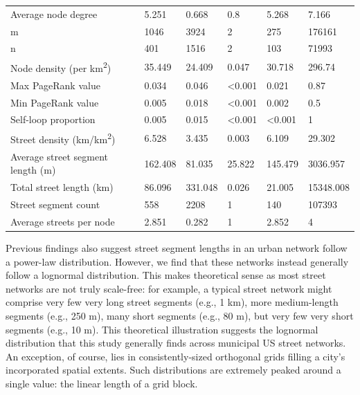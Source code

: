 \documentclass{article}
\begin{document}
\begin{table}
\begin{tabular}{llllll}
	Average node degree                         & 5.251   & 0.668   & 0.8            & 5.268          & 7.166     \\
	m                                           & 1046    & 3924    & 2              & 275            & 176161    \\
	n                                           & 401     & 1516    & 2              & 103            & 71993     \\
	Node density (per km\textsuperscript{2})                      & 35.449  & 24.409  & 0.047          & 30.718         & 296.74    \\
	Max PageRank value                          & 0.034   & 0.046   & \textless0.001 & 0.021          & 0.87      \\
	Min PageRank value                          & 0.005   & 0.018   & \textless0.001 & 0.002          & 0.5       \\
	Self-loop proportion                        & 0.005   & 0.015   & \textless0.001 & \textless0.001 & 1         \\
	Street density (km/km\textsuperscript{2})                     & 6.528   & 3.435   & 0.003          & 6.109          & 29.302    \\
	Average street segment length (m)           & 162.408 & 81.035  & 25.822         & 145.479        & 3036.957  \\
	Total street length (km)                    & 86.096  & 331.048 & 0.026          & 21.005         & 15348.008 \\
	Street segment count                        & 558     & 2208    & 1              & 140            & 107393    \\
	Average streets per node                    & 2.851   & 0.282   & 1              & 2.852          & 4         \\
	\bottomrule
\end{tabular}
\end{table}

Previous findings \citep[e.g.,][]{masucci_random_2009} also suggest street segment lengths in an urban network follow a power-law distribution. However, we find that these networks instead generally follow a lognormal distribution. This makes theoretical sense as most street networks are not truly scale-free: for example, a typical street network might comprise very few very long street segments (e.g., 1 km), more medium-length segments (e.g., 250 m), many short segments (e.g., 80 m), but very few very short segments (e.g., 10 m). This theoretical illustration suggests the lognormal distribution that this study generally finds across municipal US street networks. An exception, of course, lies in consistently-sized orthogonal grids filling a city's incorporated spatial extents. Such distributions are extremely peaked around a single value: the linear length of a grid block.
\end{document}
